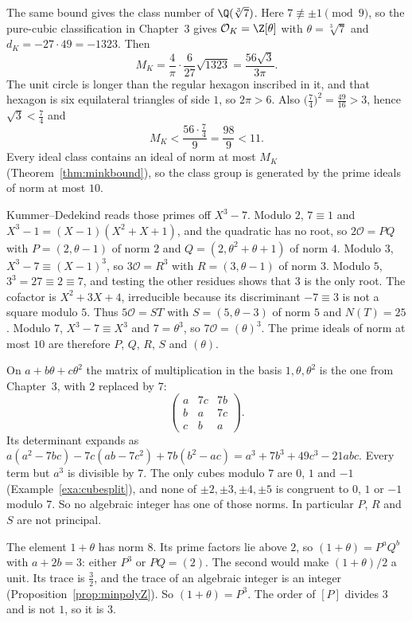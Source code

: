 The same bound gives the class number of $\Q(\sqrt[3]7)$. Here $7\not\equiv\pm1\pmod9$, so the pure-cubic classification in Chapter~3 gives
$\mathcal O_K=\Z[\theta]$ with $\theta=\sqrt[3]7$ and $d_K=-27\cdot49=-1323$. Then
\[
M_K=\frac4\pi\cdot\frac6{27}\sqrt{1323}=\frac{56\sqrt3}{3\pi}.
\]
The unit circle is longer than the regular hexagon inscribed in it, and that hexagon is six equilateral triangles of
side $1$, so $2\pi>6$. Also $\bigl(\frac74\bigr)^2=\frac{49}{16}>3$, hence $\sqrt3<\frac74$ and
\[
M_K<\frac{56\cdot\frac74}{9}=\frac{98}9<11.
\]
Every ideal class contains an ideal of norm at most $M_K$ (Theorem~\ref{thm:minkbound}), so the class group is
generated by the prime ideals of norm at most $10$.

Kummer--Dedekind reads those primes off $X^3-7$. Modulo $2$, $7\equiv1$ and $X^3-1=(X-1)(X^2+X+1)$, and the quadratic
has no root, so $2\mathcal O=PQ$ with $P=(2,\theta-1)$ of norm $2$ and $Q=(2,\theta^2+\theta+1)$ of norm $4$. Modulo
$3$, $X^3-7\equiv(X-1)^3$, so $3\mathcal O=R^3$ with $R=(3,\theta-1)$ of norm $3$. Modulo $5$, $3^3=27\equiv2\equiv7$,
and testing the other residues shows that $3$ is the only root. The cofactor is $X^2+3X+4$, irreducible because its
discriminant $-7\equiv3$ is not a square modulo $5$. Thus $5\mathcal O=ST$ with $S=(5,\theta-3)$ of norm $5$ and
$N(T)=25$. Modulo $7$, $X^3-7\equiv X^3$ and $7=\theta^3$, so $7\mathcal O=(\theta)^3$. The prime ideals of norm at
most $10$ are therefore $P$, $Q$, $R$, $S$ and $(\theta)$.

On $a+b\theta+c\theta^2$ the matrix of multiplication in the basis $1,\theta,\theta^2$ is the one from Chapter~3, with
$2$ replaced by $7$:
\[
\begin{pmatrix}a&7c&7b\\b&a&7c\\c&b&a\end{pmatrix}.
\]
Its determinant expands as $a(a^2-7bc)-7c(ab-7c^2)+7b(b^2-ac)=a^3+7b^3+49c^3-21abc$. Every term but $a^3$ is
divisible by $7$. The only cubes modulo $7$ are $0$, $1$ and $-1$ (Example~\ref{exa:cubesplit}), and none of
$\pm2,\pm3,\pm4,\pm5$ is congruent to $0$, $1$ or $-1$ modulo $7$. So no algebraic integer has one of those norms.
In particular $P$, $R$ and $S$ are not principal.

The element $1+\theta$ has norm $8$. Its prime factors lie above $2$, so $(1+\theta)=P^aQ^b$ with $a+2b=3$: either
$P^3$ or $PQ=(2)$. The second would make $(1+\theta)/2$ a unit. Its trace is $\frac32$, and the trace of an algebraic
integer is an integer (Proposition~\ref{prop:minpolyZ}). So $(1+\theta)=P^3$. The order of $[P]$ divides $3$ and is not $1$, so it is $3$.

